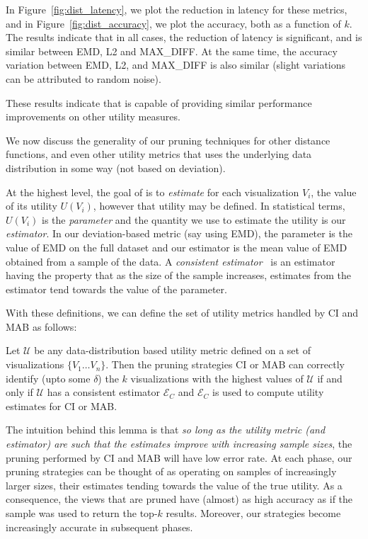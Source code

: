 {In Figure~\ref{fig:dist_latency}, we plot the reduction 
in latency for these metrics,
and in Figure~\ref{fig:dist_accuracy}, we plot the
accuracy, both as a function of $k$.
The results indicate that in all cases,
the reduction of latency is significant,
and is similar between EMD, L2 and MAX\_DIFF.
At the same time, the accuracy variation between 
EMD, L2, and MAX\_DIFF is also similar
(slight variations can be attributed to random noise).

These results indicate that \SeeDB is capable of
providing similar performance improvements on other
utility measures. 

}%

We now discuss the generality of our pruning techniques 
for other distance functions, and even other
utility metrics that uses the underlying data distribution in some way (not based on deviation).


At the highest level, the goal of \SeeDB is to {\em estimate} for each visualization $V_i$, 
the value of its utility $U(V_i)$, however that utility may be defined.
In statistical terms, $U(V_i)$ is the {\em parameter} and the quantity we use to estimate the
utility is our {\em estimator}.
In our deviation-based metric (say using EMD), the parameter is the value of EMD on the full
dataset and our estimator is the mean value of EMD obtained from a sample of the data.
A {\em consistent estimator}~\cite{consistent_estimator} is an estimator having the property 
that as the size of the sample increases, estimates from the estimator tend towards the value 
of the parameter. 

With these definitions, we can define the set of utility metrics handled by CI and MAB as follows:
\begin{lemma}
Let $\mathcal{U}$ be any data-distribution based utility metric defined on a set of visualizations $\{
V_1 \ldots V_n\}$. Then the pruning strategies CI or MAB can correctly identify (upto some $\delta$) the 
$k$ visualizations with the highest values of $\mathcal{U}$ if and only if $\mathcal{U}$ has a consistent 
estimator $\mathcal{E}_C$ and $\mathcal{E}_C$ is used to compute utility estimates for CI or MAB.
\end{lemma}

The intuition behind this lemma is that {\em so long as the utility metric (and estimator) are such that
the estimates improve with increasing sample sizes}, the pruning performed by CI and MAB will have low
error rate.
At each phase, our pruning strategies can be thought of as operating on samples of increasingly larger
sizes, their estimates tending towards the value of the true utility.
As a consequence, the views that are pruned have (almost) as high accuracy as if the sample was used to
return the top-$k$ results.
Moreover, our strategies become increasingly accurate in subsequent phases.


